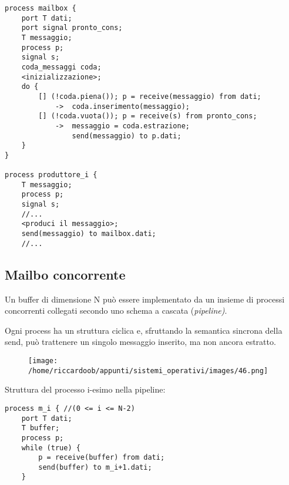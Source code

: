 \begin{verbatim}
process mailbox {
    port T dati;
    port signal pronto_cons;
    T messaggio;
    process p;
    signal s;
    coda_messaggi coda;
    <inizializzazione>;
    do {
        [] (!coda.piena()); p = receive(messaggio) from dati;
            ->  coda.inserimento(messaggio);
        [] (!coda.vuota()); p = receive(s) from pronto_cons;
            ->  messaggio = coda.estrazione;
                send(messaggio) to p.dati;
    }
}

process produttore_i {
    T messaggio;
    process p;
    signal s;
    //...
    <produci il messaggio>;
    send(messaggio) to mailbox.dati;
    //...
\end{verbatim}

\subsection{Mailbo concorrente}
Un buffer di dimensione N può essere implementato da un insieme di processi concorrenti collegati secondo uno schema a cascata (\textit{pipeline)}.

Ogni process ha un struttura ciclica e, sfruttando la semantica sincrona della send, può trattenere un singolo messaggio inserito, ma non ancora estratto.

\begin{figure}[H]
    \centering
    \texttt{[image: /home/riccardoob/appunti/sistemi\_operativi/images/46.png]}
\end{figure}

Struttura del processo i-esimo nella pipeline:
\begin{verbatim}
process m_i { //(0 <= i <= N-2)
    port T dati;
    T buffer;
    process p;
    while (true) {
        p = receive(buffer) from dati;
        send(buffer) to m_i+1.dati;
    }
\end{verbatim}


